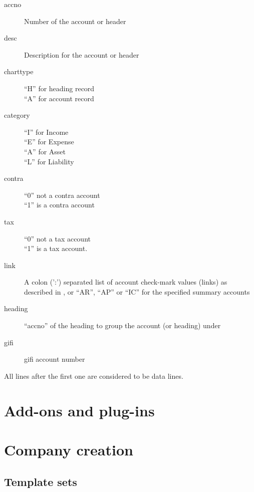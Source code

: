 \begin{description}
\item [accno] Number of the account or header
\item [desc] Description for the account or header
\item [charttype] ``H'' for heading record \\
``A'' for account record
\item [category] ``I'' for Income \\
``E'' for Expense \\
``A'' for Asset \\
``L'' for Liability
\item [contra] ``0'' not a \gls{contra} account \\
``1'' is a \gls{contra} account
\item [tax] ``0'' not a tax account \\
``1'' is a tax account.
\item [link] A colon (':') separated list of account check-mark values (links) as described
    in , or ``AR'', ``AP'' or ``IC'' for the specified summary accounts
\item [heading] ``accno'' of the heading to group the account (or heading) under
\item [gifi] \gls{gifi} account number
\end{description}

All lines after the first one are considered to be data lines.

\chapter{Add-ons and plug-ins}
\label{cha-customization-add-ons}

\chapter{Company creation}
\label{cha-customization-company-creation}

\section{Template sets}
\label{sec-customization-company-creation-templates}
